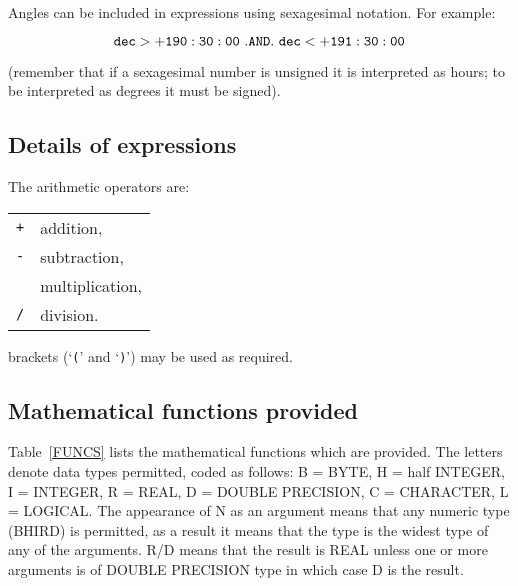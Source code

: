 \documentclass[twoside,11pt]{article}
\renewcommand{\_}{\texttt{\symbol{95}}}
\begin{document}
Angles can be included in expressions using sexagesimal notation.  For
example:

\begin{equation}
{\tt dec > +190:30:00 ~ .AND. ~ dec < +191:30:00}
\end{equation}

(remember that if a sexagesimal number is unsigned it is interpreted as
hours; to be interpreted as degrees it must be signed).

\subsection{Details of expressions}

The arithmetic operators are:

\begin{tabular}{ll}
{\tt +}  & addition,        \\
{\tt -}  & subtraction,     \\
{\tt *}  & multiplication,  \\
{\tt /}  & division.        \\
\end{tabular}

brackets (`{\tt (}' and `{\tt )}') may be used as required.


\subsection{Mathematical functions provided}

Table~\ref{FUNCS} lists the mathematical functions which are provided. 
The letters denote data types permitted, coded as follows: B = BYTE, 
H = half INTEGER, I = INTEGER, R = REAL, D = DOUBLE PRECISION, C = 
CHARACTER, L = LOGICAL. The appearance of N as an argument means that 
any numeric type (BHIRD) is permitted, as a result it means that the 
type is the widest type of any of the arguments.  R/D means that the 
result is REAL unless one or more arguments is of DOUBLE PRECISION 
type in which case D is the result. 
\end{document}
